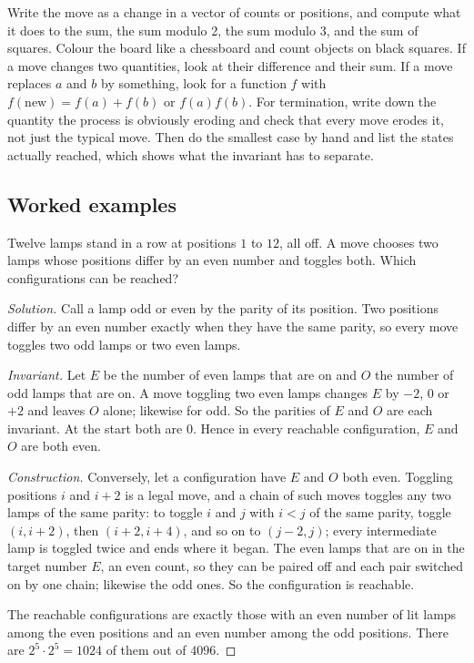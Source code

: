 \begin{firstmoves}
Write the move as a change in a vector of counts or positions, and compute what it does to the sum, the sum modulo 2, the sum modulo 3, and the sum of squares. Colour the board like a chessboard and count objects on black squares. If a move changes two quantities, look at their difference and their sum. If a move replaces $a$ and $b$ by something, look for a function $f$ with $f(\text{new}) = f(a) + f(b)$ or $f(a) f(b)$. For termination, write down the quantity the process is obviously eroding and check that every move erodes it, not just the typical move. Then do the smallest case by hand and list the states actually reached, which shows what the invariant has to separate.
\end{firstmoves}

\subsection*{Worked examples}

\begin{example}
Twelve lamps stand in a row at positions $1$ to $12$, all off. A move chooses two lamps whose positions differ by an even number and toggles both. Which configurations can be reached?
\end{example}

\begin{proof}[Solution]
Call a lamp odd or even by the parity of its position. Two positions differ by an even number exactly when they have the same parity, so every move toggles two odd lamps or two even lamps.

\emph{Invariant.} Let $E$ be the number of even lamps that are on and $O$ the number of odd lamps that are on. A move toggling two even lamps changes $E$ by $-2$, $0$ or $+2$ and leaves $O$ alone; likewise for odd. So the parities of $E$ and $O$ are each invariant. At the start both are $0$. Hence in every reachable configuration, $E$ and $O$ are both even.

\emph{Construction.} Conversely, let a configuration have $E$ and $O$ both even. Toggling positions $i$ and $i+2$ is a legal move, and a chain of such moves toggles any two lamps of the same parity: to toggle $i$ and $j$ with $i < j$ of the same parity, toggle $(i, i+2)$, then $(i+2, i+4)$, and so on to $(j-2, j)$; every intermediate lamp is toggled twice and ends where it began. The even lamps that are on in the target number $E$, an even count, so they can be paired off and each pair switched on by one chain; likewise the odd ones. So the configuration is reachable.

The reachable configurations are exactly those with an even number of lit lamps among the even positions and an even number among the odd positions. There are $2^5 \cdot 2^5 = 1024$ of them out of $4096$.
\end{proof}

